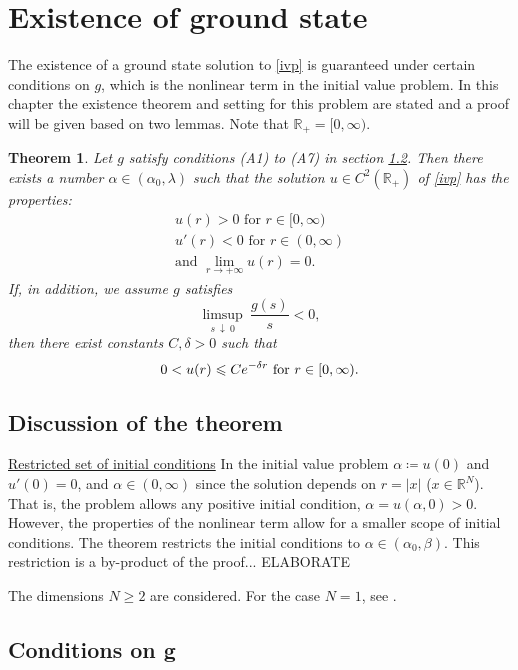 \newtheorem{thmx}{Theorem}
\renewcommand{\thethmx}{\Alph{thmx}}
\section{Existence of ground state}
The existence of a ground state solution to \eqref{ivp} is guaranteed under certain conditions on $g$, which is the nonlinear term in the initial value problem. In this chapter the existence theorem and setting for this problem are stated and a proof will be given based on two lemmas. Note that $\mathbb{R}_+=[0,\infty)$.

\begin{thmx}\label{exithm}
Let $g$ satisfy conditions (A1) to (A7) in section \ref{con}. Then there exists a number $\alpha\in(\alpha_0,\lambda)$ such that the solution $u\in C^2(\mathbb{R}_+)$ of \eqref{ivp} has the properties: \begin{gather*}u(r)>0\text{ for }r\in[0,\infty)\\u'(r)<0\text{ for }r\in(0,\infty)\\ \text{and }\lim_{r\to+\infty}u(r)=0.\end{gather*} If, in addition, we assume $g$ satisfies $$\limsup_{s~\downarrow~0}~\frac{g(s)}{s}<0,$$ then there exist constants $C,\delta>0$ such that $$0<u(r)\leq Ce^{-\delta r} ~~ \textnormal{for} ~ r\in[0,\infty).$$
\end{thmx}

\subsection{Discussion of the theorem}\hfill

\underline{Restricted set of initial conditions} In the initial value problem $\alpha\coloneqq u(0)$ and $u'(0)=0$, and $\alpha\in(0,\infty)$ since the solution depends on $r=|x|$ ($x\in\mathbb{R}^N$). That is, the problem allows any positive initial condition, $\alpha=u(\alpha,0)>0$. However, the properties of the nonlinear term allow for a smaller scope of initial conditions. The theorem restricts the initial conditions to $\alpha\in(\alpha_0,\beta)$. This restriction is a by-product of the proof... {\color{red} ELABORATE}

The dimensions $N\geq2$ are considered. For the case $N=1$, see \cite{}. 

\subsection{Conditions on g}\label{con}\hfill

